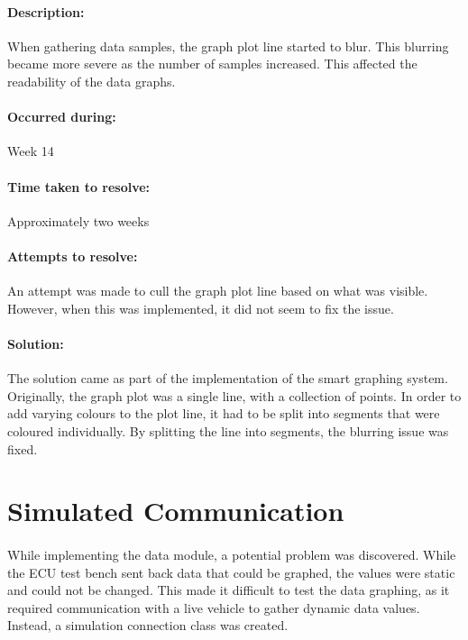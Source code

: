 {{{			\paragraph{Description:}
			When gathering data samples, the graph plot line started to blur. This blurring became more severe as the number of samples increased. This affected the readability of the data graphs.
			\paragraph{Occurred during:}
			Week 14
			\paragraph{Time taken to resolve:}
			Approximately two weeks
			\paragraph{Attempts to resolve:}
			An attempt was made to cull the graph plot line based on what was visible. However, when this was implemented, it did not seem to fix the issue. 
			\paragraph{Solution:}
			The solution came as part of the implementation of the smart graphing system. Originally, the graph plot was a single line, with a collection of points. In order to add varying colours to the plot line, it had to be split into segments that were coloured individually. By splitting the line into segments, the blurring issue was fixed.
		}
	}
	\label{ssec:DataModuleIssues}

\section{Simulated Communication}{
		\paragraph{}{
		While implementing the data module, a potential problem was discovered. While the ECU test bench sent back data that could be graphed, the values were static and could not be changed. This made it difficult to test the data graphing, as it required communication with a live vehicle to gather dynamic data values. Instead, a simulation connection class was created.
		}
}}
